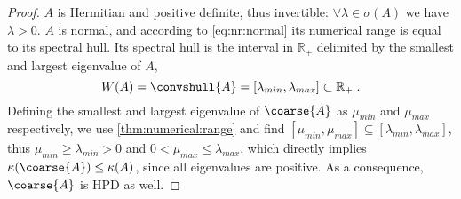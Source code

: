 \begin{proof}
$A$ is Hermitian and positive definite, thus invertible: $\forall \lambda \in \sigma(A)$ we have $\lambda > 0$.
$A$ is normal, and according to \cref{eq:nr:normal} its numerical range is equal to its spectral hull.
Its spectral hull is the interval in $\mathbb{R}_+$ delimited by the smallest and largest eigenvalue of $A$, \ie
\begin{equation}
W(A) = \convshull{A} = [ \lambda_{min}, \lambda_{max} ] \subset \mathbb{R}_+ \;.
\end{equation}
Defining the smallest and largest eigenvalue of $\coarse{A}$ as $\mu_{min}$ and $\mu_{max}$ respectively, we use \cref{thm:numerical:range} and find $[ \mu_{min}, \mu_{max}] \subseteq [ \lambda_{min}, \lambda_{max} ]$, thus $\mu_{min} \geq \lambda_{min} > 0$ and $0 < \mu_{max} \leq \lambda_{max}$, which directly implies $\kappa(\coarse{A}) \leq \kappa(A)$, since all eigenvalues are positive. As a consequence, $\coarse{A}$ is HPD as well.
\end{proof}

